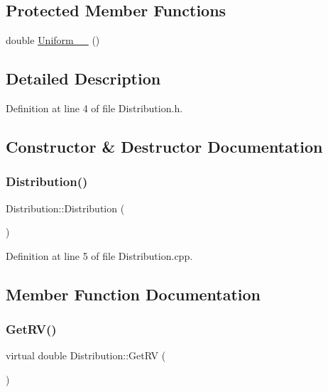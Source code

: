 \subsection*{Protected Member Functions}
\begin{DoxyCompactItemize}
\item 
double \hyperlink{class_distribution_a33965648e4c6d3bbc93c61ccd3897c98}{Uniform\+\_\+\_} ()
\end{DoxyCompactItemize}


\subsection{Detailed Description}


Definition at line 4 of file Distribution.\+h.



\subsection{Constructor \& Destructor Documentation}
\mbox{\label{class_distribution_ada837c9a1da728290d6bbea0bb6b266f}} 
\subsubsection{\texorpdfstring{Distribution()}{Distribution()}}
{\footnotesize\ttfamily Distribution\+::\+Distribution (\begin{DoxyParamCaption}{ }\end{DoxyParamCaption})}



Definition at line 5 of file Distribution.\+cpp.



\subsection{Member Function Documentation}
\mbox{\label{class_distribution_a63b433850d7b47d84eb69448f7916719}} 
\subsubsection{\texorpdfstring{Get\+R\+V()}{GetRV()}}
{\footnotesize\ttfamily virtual double Distribution\+::\+Get\+RV (\begin{DoxyParamCaption}{ }\end{DoxyParamCaption})\hspace{0.3cm}{\ttfamily [pure virtual]}}



